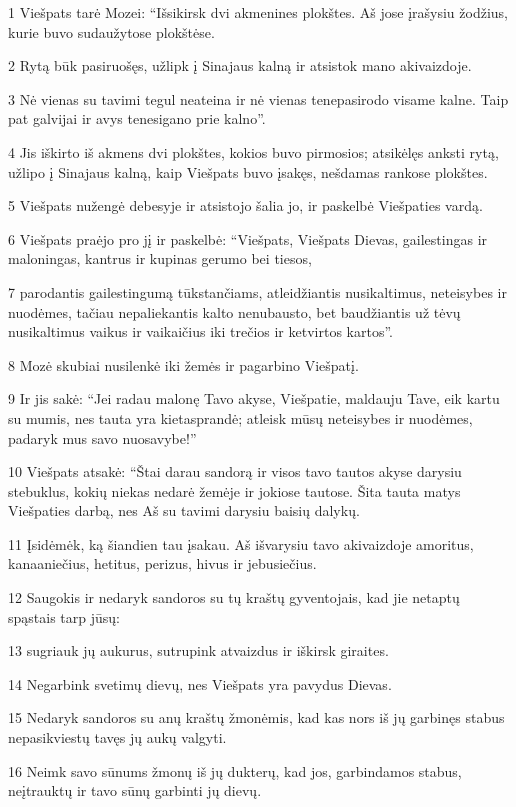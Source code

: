 \par 1 Viešpats tarė Mozei: “Išsikirsk dvi akmenines plokštes. Aš jose įrašysiu žodžius, kurie buvo sudaužytose plokštėse. 
\par 2 Rytą būk pasiruošęs, užlipk į Sinajaus kalną ir atsistok mano akivaizdoje. 
\par 3 Nė vienas su tavimi tegul neateina ir nė vienas tenepasirodo visame kalne. Taip pat galvijai ir avys tenesigano prie kalno”. 
\par 4 Jis iškirto iš akmens dvi plokštes, kokios buvo pirmosios; atsikėlęs anksti rytą, užlipo į Sinajaus kalną, kaip Viešpats buvo įsakęs, nešdamas rankose plokštes. 
\par 5 Viešpats nužengė debesyje ir atsistojo šalia jo, ir paskelbė Viešpaties vardą. 
\par 6 Viešpats praėjo pro jį ir paskelbė: “Viešpats, Viešpats Dievas, gailestingas ir maloningas, kantrus ir kupinas gerumo bei tiesos, 
\par 7 parodantis gailestingumą tūkstančiams, atleidžiantis nusikaltimus, neteisybes ir nuodėmes, tačiau nepaliekantis kalto nenubausto, bet baudžiantis už tėvų nusikaltimus vaikus ir vaikaičius iki trečios ir ketvirtos kartos”. 
\par 8 Mozė skubiai nusilenkė iki žemės ir pagarbino Viešpatį. 
\par 9 Ir jis sakė: “Jei radau malonę Tavo akyse, Viešpatie, maldauju Tave, eik kartu su mumis, nes tauta yra kietasprandė; atleisk mūsų neteisybes ir nuodėmes, padaryk mus savo nuosavybe!” 
\par 10 Viešpats atsakė: “Štai darau sandorą ir visos tavo tautos akyse darysiu stebuklus, kokių niekas nedarė žemėje ir jokiose tautose. Šita tauta matys Viešpaties darbą, nes Aš su tavimi darysiu baisių dalykų. 
\par 11 Įsidėmėk, ką šiandien tau įsakau. Aš išvarysiu tavo akivaizdoje amoritus, kanaaniečius, hetitus, perizus, hivus ir jebusiečius. 
\par 12 Saugokis ir nedaryk sandoros su tų kraštų gyventojais, kad jie netaptų spąstais tarp jūsų: 
\par 13 sugriauk jų aukurus, sutrupink atvaizdus ir iškirsk giraites. 
\par 14 Negarbink svetimų dievų, nes Viešpats yra pavydus Dievas. 
\par 15 Nedaryk sandoros su anų kraštų žmonėmis, kad kas nors iš jų garbinęs stabus nepasikviestų tavęs jų aukų valgyti. 
\par 16 Neimk savo sūnums žmonų iš jų dukterų, kad jos, garbindamos stabus, neįtrauktų ir tavo sūnų garbinti jų dievų. 
